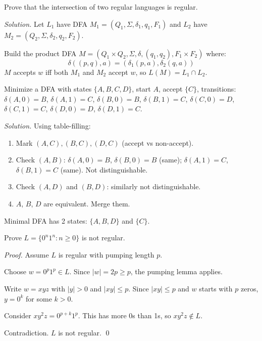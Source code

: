 \begin{example}
Prove that the intersection of two regular languages is regular.

\emph{Solution.} Let $L_1$ have DFA $M_1 = (Q_1, \Sigma, \delta_1, q_1, F_1)$ and $L_2$ have $M_2 = (Q_2, \Sigma, \delta_2, q_2, F_2)$.

Build the product DFA $M = (Q_1 \times Q_2, \Sigma, \delta, (q_1, q_2), F_1 \times F_2)$ where:
\[
\delta((p, q), a) = (\delta_1(p, a), \delta_2(q, a))
\]
$M$ accepts $w$ iff both $M_1$ and $M_2$ accept $w$, so $L(M) = L_1 \cap L_2$.
\end{example}

\begin{example}
Minimize a DFA with states $\{A, B, C, D\}$, start $A$, accept $\{C\}$, transitions:
$\delta(A,0)=B$, $\delta(A,1)=C$, $\delta(B,0)=B$, $\delta(B,1)=C$, $\delta(C,0)=D$, $\delta(C,1)=C$, $\delta(D,0)=D$, $\delta(D,1)=C$.

\emph{Solution.} Using table-filling:
\begin{enumerate}
  \item Mark $(A,C), (B,C), (D,C)$ (accept vs non-accept).
  \item Check $(A,B)$: $\delta(A,0)=B$, $\delta(B,0)=B$ (same); $\delta(A,1)=C$, $\delta(B,1)=C$ (same). Not distinguishable.
  \item Check $(A,D)$ and $(B,D)$: similarly not distinguishable.
  \item $A$, $B$, $D$ are equivalent. Merge them.
\end{enumerate}
Minimal DFA has 2 states: $\{A,B,D\}$ and $\{C\}$.
\end{example}

\begin{example}
Prove $L = \{0^n1^n : n \geq 0\}$ is not regular.

\emph{Proof.} Assume $L$ is regular with pumping length $p$.

Choose $w = 0^p1^p \in L$. Since $|w| = 2p \geq p$, the pumping lemma applies.

Write $w = xyz$ with $|y| > 0$ and $|xy| \leq p$. Since $|xy| \leq p$ and $w$ starts with $p$ zeros, $y = 0^k$ for some $k > 0$.

Consider $xy^2z = 0^{p+k}1^p$. This has more 0s than 1s, so $xy^2z \notin L$.

Contradiction. $L$ is not regular. \qed
\end{example}


